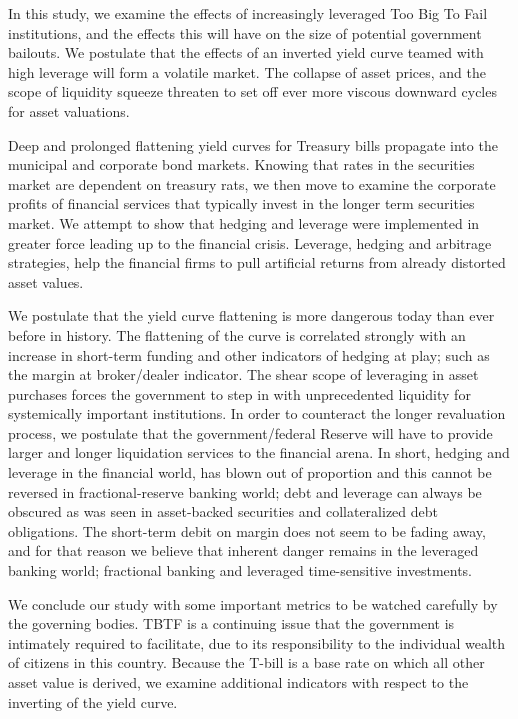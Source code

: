 \thispagestyle{empty}
	
In this study, we examine the effects of increasingly leveraged Too Big To Fail institutions, and the effects this will have on the size of potential government bailouts.  We postulate that the effects of an inverted yield curve teamed with high leverage will form a volatile market.  The collapse of asset prices, and the scope of liquidity squeeze threaten to set off ever more viscous downward cycles for asset valuations.  

Deep and prolonged flattening yield curves for Treasury bills propagate into the municipal and corporate bond markets.  Knowing that rates in the securities market are dependent on treasury rats, we then move to examine the corporate profits of financial services that typically invest in the longer term securities market.  We attempt to show that hedging and leverage were implemented in greater force leading up to the financial crisis.  Leverage, hedging and arbitrage strategies, help the financial firms to pull artificial returns from already distorted asset values.

We postulate that the yield curve flattening is more dangerous today than ever before in history.  The flattening of the curve is correlated strongly with an increase in short-term funding and other indicators of hedging at play; such as the margin at broker/dealer indicator.  The shear scope of leveraging in asset purchases forces the government to step in with unprecedented liquidity for systemically important institutions.  In order to counteract the longer revaluation process, we postulate that the government/federal Reserve will have to provide larger and longer liquidation services to the financial arena.  In short, hedging and leverage in the financial world, has blown out of proportion and this cannot be reversed in fractional-reserve banking world; debt and leverage can always be obscured as was seen in asset-backed securities and collateralized debt obligations.  The short-term debit on margin does not seem to be fading away, and for that reason we believe that inherent danger remains in the leveraged banking world; fractional banking and leveraged time-sensitive investments.

We conclude our study with some important metrics to be watched carefully by the governing bodies.  TBTF is a continuing issue that the government is intimately required to facilitate, due to its responsibility to the individual wealth of citizens in this country.   Because the T-bill is a base rate on which all other asset value is derived, we examine additional indicators with respect to the inverting of the yield curve.  


%	
